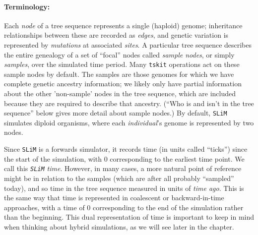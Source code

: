 \documentclass[12pt]{article}
\newcommand{\tskit}[0]{\texttt{tskit}\xspace}
\newcommand{\slim}[0]{\texttt{SLiM}\xspace}
\begin{document}
\paragraph{Terminology:}
Each \textit{node} of a tree sequence represents a single (haploid) genome;
inheritance relationships between these are recorded as \textit{edges},
and genetic variation is represented by \textit{mutations} at associated \textit{sites}.
A particular tree sequence describes the entire genealogy of a set of ``focal'' nodes called
\textit{sample nodes}, or simply \textit{samples}, over the simulated time period.
Many \tskit operations act on these sample nodes by default.
The samples are those genomes for which we have complete genetic ancestry information; 
we likely only have partial information about the other 'non-sample' nodes in the tree sequence,
which are included because they are required to describe that ancestry.
(``Who is and isn't in the tree sequence'' below gives more detail about sample nodes.)
By default, \slim simulates diploid organisms, where each \textit{individual}'s genome is represented by two nodes.

Since \slim is a forwards simulator, it records time (in units called ``ticks'')
since the start of the simulation, with 0 corresponding to the earliest time point.
We call this \textit{\slim time}.
However, in many cases, a more natural point of reference might be in relation to the samples
(which are after all probably ``sampled'' today),
and so time in the tree sequence measured in units of \textit{time ago}.
This is the same way that time
is represented in coalescent or backward-in-time approaches, with a time of 0 corresponding
to the end of the simulation rather than the beginning.
This dual representation of time is important
to keep in mind when thinking about hybrid simulations, as we will see later in the chapter.
\end{document}
